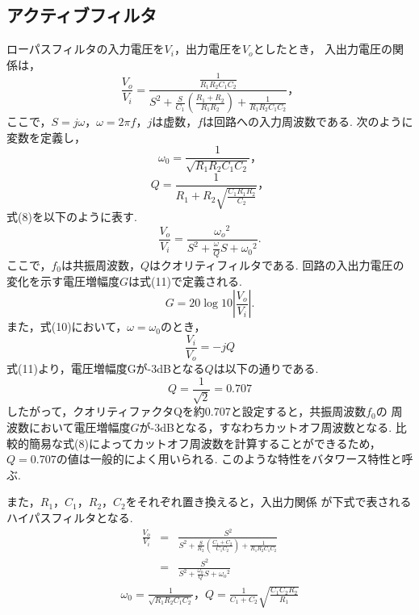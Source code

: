\documentclass[twocolumn, 10pt,a4j]{jsarticle}
\begin{document}
  \subsection{アクティブフィルタ}
      ローパスフィルタの入力電圧を$V_{i}$，出力電圧を$V_{o}$としたとき，
      入出力電圧の関係は，
        \begin{equation}
          \frac{V_{o}}{V_{i}} = \frac{\frac{1}{R_{1}R_{2}C_{1}C_{2}}}{S^{2} + \frac{S}{C_{1}} (\frac{R_{1} + R_{2}}{R_{1}R_{2}}) + \frac{1}{R_{1}R_{2}C_{1}C_{2}}  }，
        \end{equation}
      ここで，$S=j\omega$，$\omega = 2 \pi f$，$j$は虚数，$f$は回路への入力周波数である.
      次のように変数を定義し，
        \begin{equation}
          \omega_{0} = \frac{1}{\sqrt{R_{1}R_{2}C_{1}C_{2}}}，
        \end{equation}
        \begin{equation}
          Q = \frac{1}{R_{1} + R_{2}\sqrt{\frac{C_{1}R_{1}R_{2}}{C_{2}}}}，
        \end{equation}
      式(8)を以下のように表す.
        \begin{equation}
          \frac{V_{o}}{V_{i}} = \frac{{\omega_{o}}^{2}}{S^{2} + \frac{\omega_{}}{Q}S + {\omega_{0}}^{2}}.
        \end{equation}
      ここで，$f_{0}$は共振周波数，$Q$はクオリティフィルタである.
      回路の入出力電圧の変化を示す電圧増幅度$G$は式(11)で定義される.
        \begin{equation}
          G = 20 \log{10} |\frac{V_{o}}{V_{i}}|.
        \end{equation}
      また，式(10)において，$\omega = \omega_{0}$のとき，
        \begin{equation}
          \frac{V_{i}}{V_{o}} = - j Q
        \end{equation}
      式(11)より，電圧増幅度Gが-3dBとなる$Q$は以下の通りである.
        \begin{equation}
          Q = \frac{1}{\sqrt{2}} = 0.707
        \end{equation}
      したがって，クオリティファクタQを約0.707と設定すると，共振周波数$f_{0}$の
      周波数において電圧増幅度$G$が-3dBとなる，すなわちカットオフ周波数となる.
      比較的簡易な式(8)によってカットオフ周波数を計算することができるため，
      $Q = 0.707$の値は一般的によく用いられる. このような特性をバタワース特性と呼ぶ.


      また，$R_{1}$，$C_{1}$，$R_{2}$，$C_{2}$をそれぞれ置き換えると，入出力関係
      が下式で表されるハイパスフィルタとなる.
        \begin{eqnarray}
          \frac{V_{o}}{V_{i}} &=& \frac{S^{2}}{S^{2} + \frac{S}{R_{2}}(\frac{C_{1} + C_{2}}{C_{1}C_{2}}) + \frac{1}{R_{1}R_{2}C_{1}C_{2}}} \nonumber \\
          &=& \frac{S^{2}}{S^{2} +  \frac{\omega_{0}}{Q}S + {\omega_{o}}^{2} }
        \end{eqnarray}
        \begin{eqnarray}
          \omega_{0} = \frac{1}{\sqrt{R_{1}R_{2}C_{1}C_{2}}}，Q = \frac{1}{C_{1} + C_{2}} \sqrt{\frac{C_{1}C_{2}R_{2}}{R_{1}}}
        \end{eqnarray}
        
\end{document}
